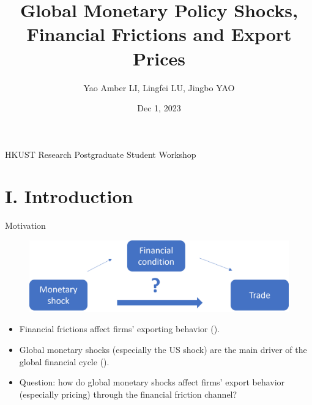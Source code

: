 \documentclass[10pt]{beamer}
\begin{document}
\title{Global Monetary Policy Shocks, Financial Frictions and Export Prices}
\author[Yao Amber LI, Lingfei LU and Jingbo YAO]{Yao Amber LI, Lingfei LU, Jingbo YAO}
\date{Dec 1, 2023}

\begin{frame}
\maketitle
\centering
HKUST Research Postgraduate Student Workshop
\end{frame}


\section{I. Introduction}

\begin{frame}{Motivation}
    \begin{figure}[htbp]
	\centering
	\includegraphics[width=0.7\columnwidth]{latex/drafts/pic/concepts.png}
	\label{fig.concept}
    \end{figure}
    
\begin{itemize}
    \item Financial frictions affect firms' exporting behavior (\citealp{manova2013credit}).
    \medskip
    \item Global monetary shocks (especially the US shock) are the main driver of the global financial cycle (\citealp{miranda2020us}).
    \medskip
    \item Question: how do global monetary shocks affect firms' export behavior (especially pricing) through the financial friction channel?
\end{itemize}
\end{frame}
\end{document}
